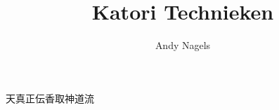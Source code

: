 \title{Katori Technieken}
\author{Andy Nagels}
\maketitle
\thispagestyle{empty} %
\begin{figure}[H]
\centering
\end{figure}

\begin{center}
天真正伝香取神道流
\end{center}

\begin{figure}[H]
\centering
\end{figure}
